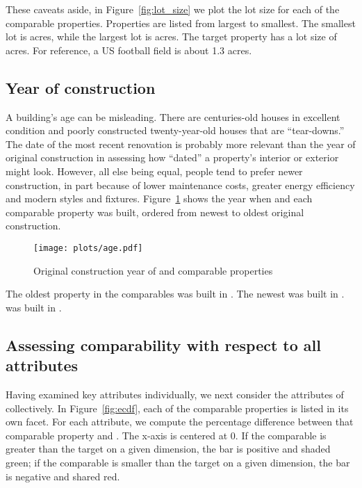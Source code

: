 \documentclass[
12pt, %
letterpaper, %
oneside, %
headinclude,footinclude, %
BCOR5mm, %
]{scrartcl}
\begin{document}
These caveats aside, in Figure~\ref{fig:lot_size} we plot the lot size for each of the comparable properties. 
Properties are listed from largest to smallest.
The smallest lot is \SmallestLot{} acres, while the largest lot is \LargestLot{} acres.
The target property has a lot size of \PropertyLotSize{} acres.
For reference, a US football field is about 1.3 acres.
\ExtremeWarningLargestLot{}
\ExtremeWarningSmallestLot{}

\subsection{Year of construction}
A building's age can be misleading. There are centuries-old houses in excellent condition and poorly constructed twenty-year-old houses that are ``tear-downs.''
The date of the most recent renovation is probably more relevant than the year of original construction in assessing how ``dated'' a property's interior or exterior might look. 
However, all else being equal, people tend to prefer newer construction, in part because of lower maintenance costs, greater energy efficiency and modern styles and fixtures.
Figure~\ref{fig:age} shows the year when \PropertyName{} and each comparable property was built, ordered from newest to oldest original construction.

\begin{figure}
\centering
\caption{Original construction year of \PropertyName{} and comparable properties} \label{fig:age}  
\texttt{[image: plots/age.pdf]} 
\end{figure}

The oldest property in the comparables was built in \Oldest{}. The newest was built in \Youngest{}.
\PropertyName{} was built in \PropertyYearBuilt{}. 
\ExtremeWarningAgeYoung{}
\ExtremeWarningAgeOld{}

\subsection{Assessing comparability with respect to all attributes}

Having examined key attributes individually, we next consider the attributes of \PropertyName{} collectively.
In Figure~\ref{fig:ecdf}, each of the comparable properties is listed in its own facet.
For each attribute, we compute the percentage difference between that comparable property and \PropertyName{}.
The x-axis is centered at 0.  
If the comparable is greater than the target on a given dimension, the bar is positive and shaded green;
if the comparable is smaller than the target on a given dimension, the bar is negative and shared red. 
\end{document}
